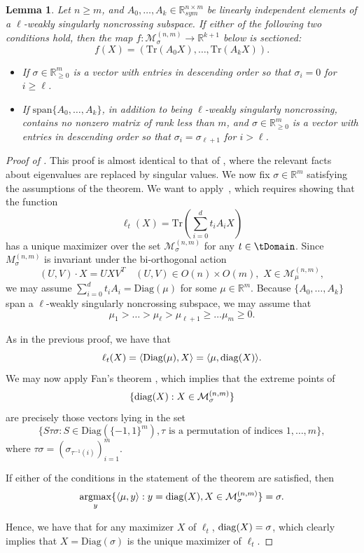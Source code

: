 \documentclass{article}
\numberwithin{equation}{section}
\newcommand{\tr}{\mathrm{Tr}}
\newcommand{\diag}{{\rm diag}}
\newcommand{\R}{\mathbb{R}}
\newcommand{\Diag}{\text{Diag}}
\newcommand{\argmax}{\operatornamewithlimits{argmax}}
\newtheorem{lemma}{Lemma}[section]
\newcommand{\cM}{{\mathcal{M}}}
\begin{document}
\begin{lemma}
    \label{lem:sing}
    Let $n \ge m$, and $A_0, \dots, A_k \in \R^{n\times m}_{sym}$ be linearly independent elements of a $\ell$-weakly singularly noncrossing subspace.
    If either of the following two conditions hold, then the map  $f:\cM_{\sigma}^{(n,m)} \rightarrow \R^{k+1}$ below is sectioned:
    \[
        f(X) = (\tr(A_0 X), \dots, \tr(A_kX)).
    \]
    \begin{itemize}
    \item If $\sigma \in \R_{\ge 0}^m$ is a vector with entries in descending order so that $\sigma_i = 0$ for $i \ge \ell$.

    \item If $\text{span} \{A_0, \dots, A_k\}$, in addition to being $\ell$-weakly singularly noncrossing, contains no nonzero matrix of rank less than $m$, and $\sigma \in \R_{\ge 0}^m$ is a vector with entries in descending order so that $\sigma_i = \sigma_{\ell+1}$ for $i > \ell$.
    \end{itemize}
\end{lemma}
\begin{proof}[Proof of ]
This proof is almost identical to that of , where the relevant facts about eigenvalues are replaced by singular values.
We now fix $\sigma \in \R^m$ satisfying the assumptions of the theorem. We want to apply~, which requires showing that the function 
\[
    \ell_t(X) = \tr\left(\sum_{i=0}^{d} t_iA_i X\right)
\]
has a unique maximizer over the set $\cM_{\sigma}^{(n,m)}$ for any $t \in \tDomain$.
Since $M_{\sigma}^{(n,m)}$ is invariant under the bi-orthogonal action 
\[
(U,V) \cdot X = U X V^T 
\quad (U,V)\in O(n) \times O(m),
\, \, X\in \cM_{\mu}^{(n,m)},
\]
we may assume $\sum_{i=0}^{d} t_iA_i = \Diag(\mu)$ for some $\mu \in \R^m$.
Because $\{A_0, \dots, A_k\}$ span a $\ell$-weakly singularly noncrossing subspace, we may assume that
\[
    \mu_1 > \dots > \mu_{\ell} > \mu_{\ell+1} \ge \dots \mu_m \ge 0.
\]

As in the previous proof, we have that 
\[
    \ell_t(X) = \langle \Diag(\mu), X\rangle = \langle \mu, \diag(X)\rangle.
\] We may now apply Fan's theorem \cite{fan1951maximum}, which implies that the extreme points of 
\[
    \{\diag(X) : X \in \cM_{\sigma}^{(n,m)}\}
\]
are precisely those vectors lying in the set
\[
    \{S \tau \sigma : S \in \Diag(\{-1, 1\}^m), \tau \text{ is a permutation of indices } 1, \ldots , m\},
\]
where $\tau \sigma = (\sigma_{\tau^{-1}(i)})_{i=1}^m$.

If either of the conditions in the statement of the theorem are satisfied, then
\[
    \argmax_y \{\langle \mu, y\rangle : y = \diag(X), X \in \cM_{\sigma}^{(n,m)}\} = \sigma.
\]

Hence, we have that for any maximizer $X$ of $\ell_t$, $\diag(X) = \sigma$, which clearly implies that $X = \Diag(\sigma)$ is the unique maximizer of $\ell_t$.
\end{proof}
\end{document}
